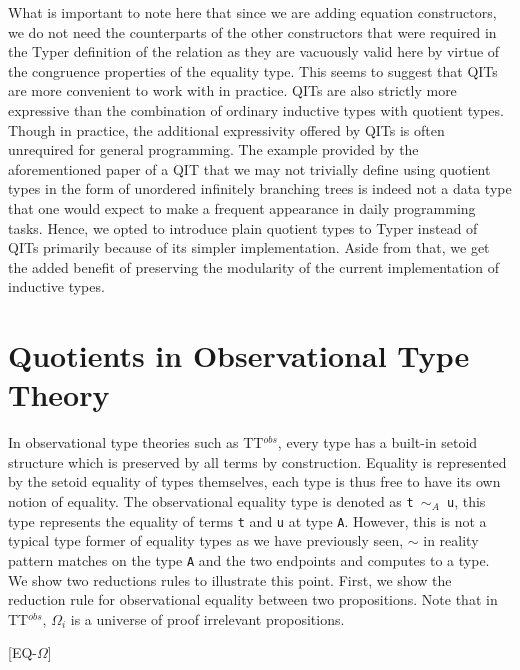 \documentclass[12pt,twoside,maitrise]{dms}
\theoremstyle{definition}
\numberwithin{equation}{section}
\numberwithin{table}{chapter}
\numberwithin{figure}{chapter}
\newcommand\kw[1] {\textsf{#1}}
\newcommand\id[1] {\texttt{#1}}
\newcommand\fn[1] {\texttt{#1}}
\begin{document}
What is important to note here that since we are adding equation constructors,
we do not need the counterparts of the other constructors that were required in
the Typer definition of the relation as they are vacuously valid here by virtue
of the congruence properties of the equality type. This seems to suggest that
QITs are more convenient to work with in practice. QITs are also strictly more
expressive than the combination of ordinary inductive types with quotient
types\cite{fiore2022quotients}. Though in practice, the additional expressivity
offered by QITs is often unrequired for general programming. The example
provided by the aforementioned paper of a QIT that we may not trivially define
using quotient types in the form of unordered infinitely branching trees is
indeed not a data type that one would expect to make a frequent appearance in
daily programming tasks. Hence, we opted to introduce plain quotient types to
Typer instead of QITs primarily because of its simpler implementation. Aside
from that, we get the added benefit of preserving the modularity of the current
implementation of inductive types.

\section{Quotients in Observational Type Theory}


In observational type theories such as TT$^{obs}$\cite{pujet2022observational},
every type has a built-in setoid structure which is preserved by all terms by
construction. Equality is represented by the setoid equality of types
themselves, each type is thus free to have its own notion of equality. The
observational equality type is denoted as \fn{t $\sim_A$ u}, this type
represents the equality of terms \id{t} and \id{u} at type \id{A}. However, this
is not a typical type former of equality types as we have previously seen,
$\sim$ in reality pattern matches on the type \id{A} and the two endpoints and
computes to a type. We show two reductions rules to illustrate this point.
First, we show the reduction rule for observational equality between two
propositions. Note that in TT$^{obs}$, $\Omega_i$ is a universe of proof
irrelevant propositions.

\begin{prooftree*}

  [\kw{EQ-$\Omega$}]{}
\end{prooftree*}
\end{document}
